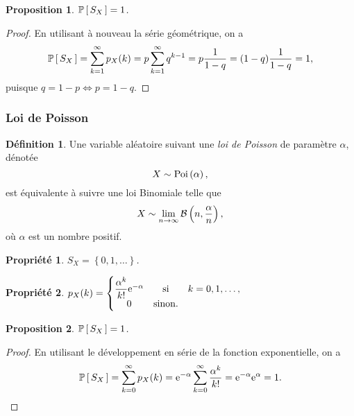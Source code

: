 \documentclass[11pt]{article}
\makeatletter
\renewcommand\P[1]{%
	\ensuremath{%
		\mathbb{P}\left[\,#1\,\right]%
	}%
}%
\newcommand\e{%
	\ensuremath{%
		\mathrm{e}%
	}%
}%
\newcommand\Bin[2]{%
	\ensuremath{%
		\mathcal{B}\left(#1,#2\right)%
	}%
}%
\newcommand\Poi[1]{%
	\ensuremath{%
		\mathrm{Poi}\left(#1\right)%
	}%
}%
\newtheorem*{proposition}{Proposition}
\newtheorem{property}{Propriété}
\theoremstyle{remark}
\theoremstyle{definition}
\newtheorem*{@definition}{Définition}
\newenvironment{definition}{%
	\begin{@definition}%
}{%
	\end{@definition}%
	\setcounter{property}{0}%
}
\makeatother
\begin{document}
\begin{proposition}
	$\P{S_X}=1$.
\end{proposition}

\begin{proof}
	En utilisant à nouveau la série géométrique, on a
	\begin{equation*}
		\P{S_X}
		=\sum_{k=1}^\infty p_X(k)
		=p\sum_{k=1}^\infty q^{k-1}
		=p\frac{1}{1-q}
		=(1-q)\frac{1}{1-q}
		=1,
	\end{equation*}
	puisque $q=1-p\Leftrightarrow p=1-q$.
\end{proof}

\subsubsection{Loi de Poisson}
\begin{definition}
	Une variable aléatoire suivant une \textit{loi de Poisson} de paramètre
	$\alpha$, dénotée
	\begin{equation*}
		X\sim\Poi{\alpha},
	\end{equation*}
	est équivalente à suivre une loi Binomiale telle que
	\begin{equation*}
		X\sim\lim_{n\rightarrow\infty}\Bin{n}{\frac{\alpha}{n}},
	\end{equation*}
	où $\alpha$ est un nombre positif.
\end{definition}

\begin{property}
	$S_X=\left\{0,1,\dots\right\}$.
\end{property}

\begin{property}
	$p_X(k)=\left\{
		\begin{matrix}
			\dfrac{\alpha^k}{k!}\e^{-\alpha} & \text{si} & k=0,1,\dots,\\
			0                                & \text{sinon}.\\
		\end{matrix}
	\right.$
\end{property}

\begin{proposition}
	$\P{S_X}=1$.
\end{proposition}

\begin{proof}
	En utilisant le développement en série de la fonction exponentielle, on a
	\begin{equation*}
		\P{S_X}
		=\sum_{k=0}^\infty p_X(k)
		=\e^{-\alpha}\sum_{k=0}^\infty\frac{\alpha^k}{k!}
		=\e^{-\alpha}\e^\alpha
		=1.\qedhere
	\end{equation*}
\end{proof}
\end{document}
